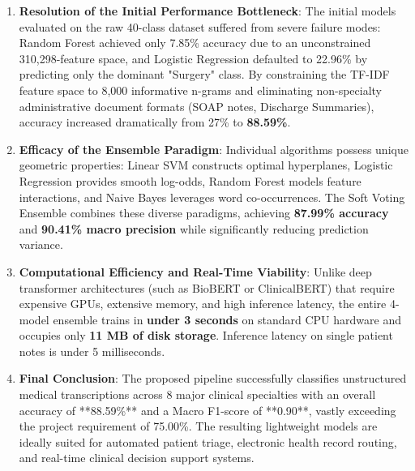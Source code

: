 \begin{enumerate}
    \item \textbf{Resolution of the Initial Performance Bottleneck}:
    The initial models evaluated on the raw 40-class dataset suffered from severe failure modes: Random Forest achieved only 7.85\% accuracy due to an unconstrained 310,298-feature space, and Logistic Regression defaulted to 22.96\% by predicting only the dominant "Surgery" class. 
    By constraining the TF-IDF feature space to 8,000 informative n-grams and eliminating non-specialty administrative document formats (SOAP notes, Discharge Summaries), accuracy increased dramatically from 27\% to \textbf{88.59\%}.

    \item \textbf{Efficacy of the Ensemble Paradigm}:
    Individual algorithms possess unique geometric properties: Linear SVM constructs optimal hyperplanes, Logistic Regression provides smooth log-odds, Random Forest models feature interactions, and Naive Bayes leverages word co-occurrences. The Soft Voting Ensemble combines these diverse paradigms, achieving \textbf{87.99\% accuracy} and \textbf{90.41\% macro precision} while significantly reducing prediction variance.

    \item \textbf{Computational Efficiency and Real-Time Viability}:
    Unlike deep transformer architectures (such as BioBERT or ClinicalBERT) that require expensive GPUs, extensive memory, and high inference latency, the entire 4-model ensemble trains in \textbf{under 3 seconds} on standard CPU hardware and occupies only \textbf{11 MB of disk storage}. Inference latency on single patient notes is under 5 milliseconds.

    \item \textbf{Final Conclusion}:
    The proposed pipeline successfully classifies unstructured medical transcriptions across 8 major clinical specialties with an overall accuracy of **88.59\%** and a Macro F1-score of **0.90**, vastly exceeding the project requirement of 75.00\%. The resulting lightweight models are ideally suited for automated patient triage, electronic health record routing, and real-time clinical decision support systems.
\end{enumerate}
